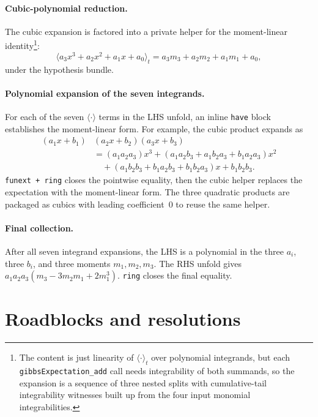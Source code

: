 \documentclass[11pt]{article}
\begin{document}
\paragraph{Cubic-polynomial reduction.} The cubic expansion is
factored into a private helper for the moment-linear identity\footnote{The
content is just linearity of $\langle \cdot \rangle_t$ over polynomial
integrands, but each \texttt{gibbsExpectation\_add} call needs
integrability of both summands, so the expansion is a sequence of
three nested splits with cumulative-tail integrability witnesses
built up from the four input monomial integrabilities.}:
\begin{equation*}
  \langle a_3 x^3 + a_2 x^2 + a_1 x + a_0 \rangle_t
  = a_3 m_3 + a_2 m_2 + a_1 m_1 + a_0,
\end{equation*}
under the hypothesis bundle.

\paragraph{Polynomial expansion of the seven integrands.} For each of
the seven $\langle \cdot \rangle$ terms in the LHS unfold, an inline
\texttt{have} block establishes the moment-linear form. For example,
the cubic product expands as
\begin{align*}
  (a_1 x + b_1)&(a_2 x + b_2)(a_3 x + b_3) \\
  &= (a_1 a_2 a_3) x^3 + (a_1 a_2 b_3 + a_1 b_2 a_3 + b_1 a_2 a_3) x^2 \\
  &\quad + (a_1 b_2 b_3 + b_1 a_2 b_3 + b_1 b_2 a_3) x + b_1 b_2 b_3.
\end{align*}
\texttt{funext + ring} closes the pointwise equality, then the cubic
helper replaces the expectation with the moment-linear form. The
three quadratic products are packaged as cubics with leading
coefficient~$0$ to reuse the same helper.

\paragraph{Final collection.} After all seven integrand expansions,
the LHS is a polynomial in the three $a_i$, three $b_i$, and three
moments $m_1, m_2, m_3$. The RHS unfold gives
$a_1 a_2 a_3 (m_3 - 3 m_2 m_1 + 2 m_1^3)$. \texttt{ring} closes the
final equality.

\section{Roadblocks and resolutions}
\end{document}
